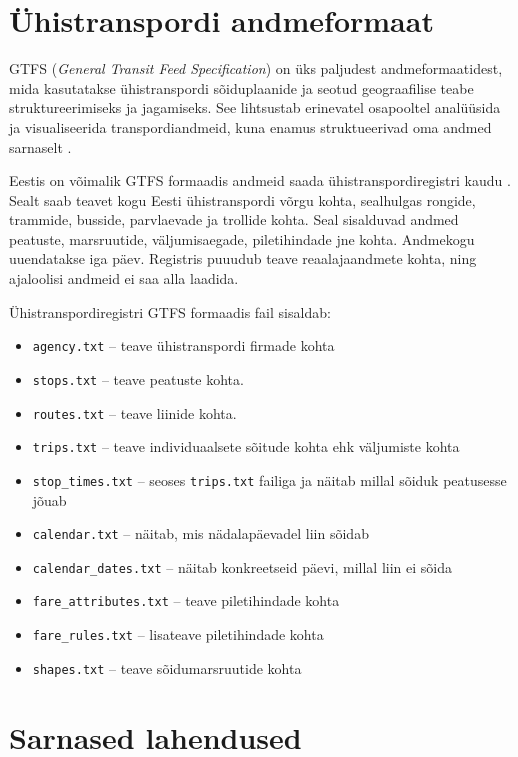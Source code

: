 
\section{Ühistranspordi andmeformaat}

GTFS (\textit{General Transit Feed Specification}) on üks paljudest andmeformaatidest, mida kasutatakse ühistranspordi sõiduplaanide ja seotud geograafilise teabe struktureerimiseks ja jagamiseks. See lihtsustab erinevatel osapooltel analüüsida ja visualiseerida transpordiandmeid, kuna enamus struktueerivad oma andmed sarnaselt \cite{GTFS}. 

Eestis on võimalik GTFS formaadis andmeid saada ühistranspordiregistri kaudu  \cite{üt-infosüsteem}. Sealt saab teavet kogu Eesti ühistranspordi võrgu kohta, sealhulgas rongide, trammide, busside, parvlaevade ja trollide kohta. Seal sisalduvad andmed peatuste, marsruutide, väljumisaegade, piletihindade jne kohta. Andmekogu uuendatakse iga päev. Registris puuudub teave reaalajaandmete kohta, ning ajaloolisi andmeid ei saa alla laadida. 

Ühistranspordiregistri GTFS formaadis fail sisaldab:
\begin{itemize}
    \item \texttt{agency.txt} – teave ühistranspordi firmade kohta
    \item \texttt{stops.txt} – teave peatuste kohta.
    \item \texttt{routes.txt} – teave liinide kohta.
    \item \texttt{trips.txt} – teave individuaalsete sõitude kohta ehk väljumiste kohta
    \item \texttt{stop\_times.txt} – seoses \texttt{trips.txt} failiga ja näitab millal sõiduk peatusesse jõuab
    \item \texttt{calendar.txt} – näitab, mis nädalapäevadel liin sõidab
    \item \texttt{calendar\_dates.txt} – näitab konkreetseid päevi, millal liin ei sõida 
    \item \texttt{fare\_attributes.txt} – teave piletihindade kohta
    \item \texttt{fare\_rules.txt} – lisateave piletihindade kohta
    \item \texttt{shapes.txt} – teave sõidumarsruutide kohta
\end{itemize}

\section{Sarnased lahendused}

